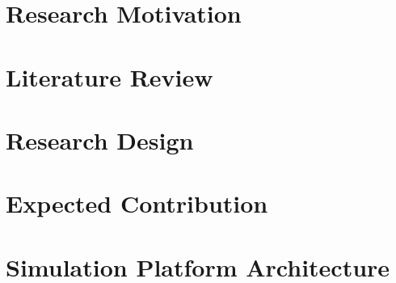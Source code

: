\documentclass[a4paper]{article}
\begin{document}
	


\tableofcontents
\clearpage
\listoffigures
\clearpage


\section{Research Motivation}
\label{sec:research_motivation}

\clearpage

\section{Literature Review}
\label{sec:literature_review}

\clearpage

\section{Research Design}
\label{sec:research_design}


\section{Expected Contribution}
\label{sec:expected_contribution}

\clearpage

\section{Simulation Platform Architecture}
\label{sec:Simulation Platform Architecture}


\clearpage
\printbibliography
\end{document}
